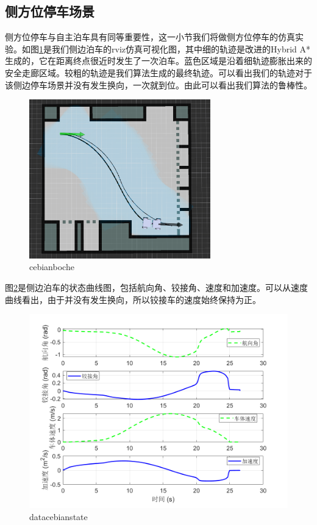\documentclass[master,academic]{ysuthesis} %
\begin{document}
		\subsection{侧方位停车场景}
		侧方位停车与自主泊车具有同等重要性，这一小节我们将做侧方位停车的仿真实验。如图\ref{fig:cebianboche}是我们侧边泊车的rviz仿真可视化图，其中细的轨迹是改进的Hybrid A*生成的，它在距离终点很近时发生了一次泊车。蓝色区域是沿着细轨迹膨胀出来的安全走廊区域。较粗的轨迹是我们算法生成的最终轨迹。可以看出我们的轨迹对于该侧边停车场景并没有发生换向，一次就到位。由此可以看出我们算法的鲁棒性。
		\begin{figure}[!ht]
			\centering
			\includegraphics[width=0.7\textwidth]{cebianboche.png}
			\caption{cebianboche}
			\label{fig:cebianboche}
		\end{figure}

		图\ref{fig:datacebianstate}是侧边泊车的状态曲线图，包括航向角、铰接角、速度和加速度。可以从速度曲线看出，由于并没有发生换向，所以铰接车的速度始终保持为正。
		\begin{figure}[!ht]
			\centering
			\includegraphics[width=1\textwidth]{datacebianstate.png}
			\caption{datacebianstate}
			\label{fig:datacebianstate}
		\end{figure}
\end{document}
